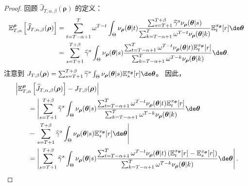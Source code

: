 \begin{proof}
回顾 $\widehat{J}_{T,\alpha,\beta}(\boldsymbol\rho)$ 的定义：
\begin{align*}
    \mathbb{E}^{\boldsymbol\rho}_{T,\alpha}\left[\widehat{J}_{T,\alpha,\beta}(\boldsymbol\rho)\right] & = \sum_{t=T-\alpha+1}^T \omega^{T-t}  \int_{\Theta} \nu_{\boldsymbol\rho}(\boldsymbol\theta|t) \frac{\sum_{s=T+1}^{T+\beta} \widehat{\gamma}^s \nu_{\boldsymbol\rho}(\boldsymbol\theta|s)}{\sum_{k=T-\alpha+1}^T \omega^{T-t} \nu_{\boldsymbol\rho}(\boldsymbol\theta|k)} \mathbb{E}_t^{\pi_{\boldsymbol\theta}}[r]  \de \boldsymbol\theta \\
    & = \sum_{s=T+1}^{T+\beta} \widehat{\gamma}^s \int_{\Theta}  \nu_{\boldsymbol\rho}(\boldsymbol\theta|s) \frac{\sum_{t=T-\alpha+1}^T \omega^{T-t} \nu_{\boldsymbol\rho}(\boldsymbol\theta|t) \mathbb{E}_t^{\pi_{\boldsymbol\theta}}[r]  }{\sum_{k=T-\alpha+1}^T \omega^{T-k} \nu_{\boldsymbol\rho}(\boldsymbol\theta|k)} \de \boldsymbol\theta.
\end{align*}
注意到 $J_{T,\beta}(\boldsymbol\rho) = \sum_{s=T+1}^{T+\beta} \widehat{\gamma}^s \int_{\Theta} \nu_{\boldsymbol\rho}(\boldsymbol\theta|s) \mathbb{E}_s^{\pi_{\boldsymbol\theta}}[r] \de \boldsymbol\theta$。
因此，
\begin{align*}
    &\left\vert \mathbb{E}^{\boldsymbol\rho}_{T,\alpha}\left[\widehat{J}_{T,\alpha,\beta}(\boldsymbol\rho)\right] - J_{T,\beta}(\boldsymbol\rho)\right\vert
    \\
    &\qquad =\left| \sum_{s=T+1}^{T+\beta} \widehat{\gamma}^s \int_{\Theta}  \nu_{\boldsymbol\rho}(\boldsymbol\theta|s) \frac{\sum_{t=T-\alpha+1}^T \omega^{T-t} \nu_{\boldsymbol\rho}(\boldsymbol\theta|t) \mathbb{E}_t^{\pi_{\boldsymbol\theta}}[r]  }{\sum_{k=T-\alpha+1}^T \omega^{T-k} \nu_{\boldsymbol\rho}(\boldsymbol\theta|k)} \de \boldsymbol\theta \right.
    \\
    &\qquad - \left.\sum_{s=T+1}^{T+\beta} \widehat{\gamma}^s \int_{\Theta} \nu_{\boldsymbol\rho}(\boldsymbol\theta|s) \mathbb{E}_s^{\pi_{\boldsymbol\theta}}[r] \de \boldsymbol\theta \right|
    \\
    &\qquad = \left| \sum_{s=T+1}^{T+\beta} \widehat{\gamma}^s \int_{\Theta}  \nu_{\boldsymbol\rho}(\boldsymbol\theta|s) \frac{\sum_{t=T-\alpha+1}^T \omega^{T-t} \nu_{\boldsymbol\rho}(\boldsymbol\theta|t) \left(\mathbb{E}_t^{\pi_{\boldsymbol\theta}}[r] - \mathbb{E}_s^{\pi_{\boldsymbol\theta}}[r] \right) }{\sum_{k=T-\alpha+1}^T \omega^{T-k} \nu_{\boldsymbol\rho}(\boldsymbol\theta|k)} \de \boldsymbol\theta  \right|.
\end{align*}

\end{proof}
